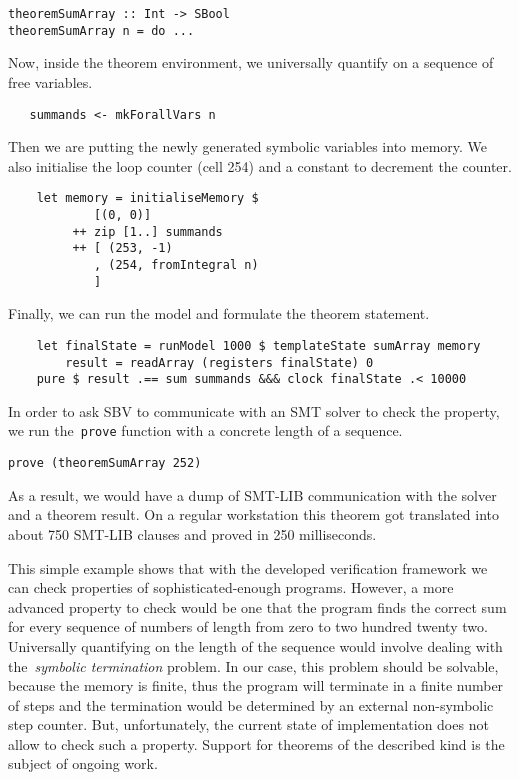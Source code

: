 \begin{verbatim}
theoremSumArray :: Int -> SBool
theoremSumArray n = do ...
\end{verbatim}

Now, inside the theorem environment, we universally quantify on a
sequence of free variables.

\begin{verbatim}
   summands <- mkForallVars n
\end{verbatim}

Then we are putting the newly generated symbolic variables into memory. We also
initialise the loop counter (cell 254) and a constant to decrement the counter.

\clearpage

\begin{verbatim}
    let memory = initialiseMemory $
            [(0, 0)]
         ++ zip [1..] summands
         ++ [ (253, -1)
            , (254, fromIntegral n)
            ]
\end{verbatim}

Finally, we can run the model and formulate the theorem statement.

\begin{verbatim}
    let finalState = runModel 1000 $ templateState sumArray memory
        result = readArray (registers finalState) 0
    pure $ result .== sum summands &&& clock finalState .< 10000
\end{verbatim}

In order to ask SBV to communicate with an SMT solver to check the property,
we run the~\texttt{prove} function with a concrete length of a sequence.

\begin{verbatim}
prove (theoremSumArray 252)
\end{verbatim}

As a result, we would have a dump of SMT-LIB communication with the solver and
a theorem result. On a regular workstation this theorem got translated into about
750 SMT-LIB clauses and proved in 250 milliseconds.

This simple example shows that with the developed verification framework we can
check properties of sophisticated-enough programs. However, a more advanced
property to check would be one that the program finds the correct sum for every
sequence of numbers of length from zero to two hundred twenty two. Universally
quantifying on the length of the sequence would involve dealing with
the~\emph{symbolic termination} problem. In our case, this problem should be solvable,
because the memory is finite, thus the program will terminate in a finite number of
steps and the termination would be determined by an external non-symbolic step counter.
But, unfortunately, the current state of implementation does not allow to check such a
property. Support for theorems of the described kind is the subject of ongoing work.